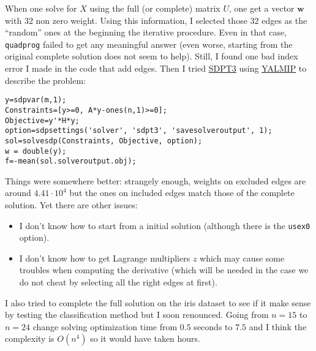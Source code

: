 \documentclass[a4paper,final,11pt]{article}
\newcommand{\bm}[1]{\boldsymbol{#1}}
\begin{document}
When one solve for $X$ using the full (or complete) matrix $U$, one get a
vector $\bm{w}$ with 32 non zero weight. Using this information, I selected those
32 edges as the \enquote{random} ones at the beginning the iterative
procedure. Even in that case, \texttt{quadprog} failed to get any meaningful
answer (even worse, starting from the original complete solution does not seem
to help). Still, I found one bad index error I made in the code that add
edges. Then I tried
\href{http://www.math.nus.edu.sg/~mattohkc/sdpt3.html}{SDPT3} using
\href{http://users.isy.liu.se/johanl/yalmip/}{YALMIP} to describe the problem:

\begin{lstlisting}
y=sdpvar(m,1);
Constraints=[y>=0, A*y-ones(n,1)>=0];
Objective=y'*H*y;
option=sdpsettings('solver', 'sdpt3', 'savesolveroutput', 1);
sol=solvesdp(Constraints, Objective, option);
w = double(y);
f=-mean(sol.solveroutput.obj);
\end{lstlisting}

Things were somewhere better: strangely enough, weights on excluded edges are
around $4.41\cdot 10^4$ but the ones on included edges match those of the
complete solution. Yet there are other issues:

\begin{itemize}
	\item I don't know how to start from a initial solution (although
		there is the \texttt{usex0} option).
	\item I don't know how to get Lagrange multipliers $z$ which may cause
		some troubles when computing the derivative (which will be
		needed in the case we do not cheat by selecting all the right
		edges at first).
\end{itemize}

I also tried to complete the full solution on the iris dataset to see if it
make sense by testing the classification method but I soon renounced. Going
from $n=15$ to $n=24$ change solving optimization time from $0.5$ seconds to
$7.5$ and I think the complexity is $O(n^4)$ so it would have taken hours.

\bigbreak
\end{document}
